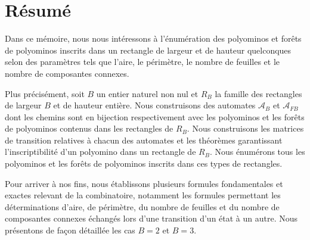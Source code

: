 \chapter*{Résumé}
Dans ce mémoire, nous nous intéressons à l'énumération des polyominos et forêts de polyominos inscrits dans un rectangle de largeur et de hauteur quelconques selon des paramètres tels que l'aire, le périmètre, le nombre de feuilles et le nombre de composantes connexes.

 Plus précisément, soit $B$ un entier naturel non nul et $R_{B}$ la famille des rectangles de largeur $B$ et de hauteur entière. Nous construisons des automates $\mathcal{A}_{B}$ et $\mathcal{A}_{FB}$ dont les chemins sont en bijection respectivement avec les polyominos et les forêts de polyominos contenus dans les rectangles de $R_{B}$. Nous construisons les matrices de transition relatives à chacun des automates  et les théorèmes garantissant l'inscriptibilité  d'un polyomino dans un rectangle de $R_{B}$. Nous énumérons tous les polyominos et les forêts de polyominos inscrits dans ces types de rectangles.
 
  Pour arriver à nos fins, nous établissons plusieurs formules fondamentales et exactes relevant de la combinatoire, notamment les formules permettant les déterminations d'aire, de périmètre, du nombre de feuilles et du nombre de composantes connexes échangés lors d'une transition d'un état à un autre. Nous présentons de façon détaillée les cas $B=2$ et $B=3$.